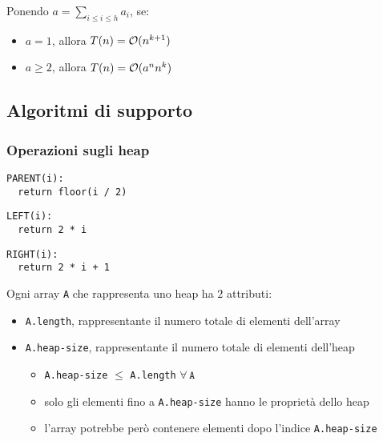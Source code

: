 \documentclass[italian, 10pt]{article}
\begin{document}
Ponendo \(a = \displaystyle \sum_{i \leq i \leq h} a_i\), se:

\begin{itemize}
  \item \(a = 1\), allora \(T(n) = \mathcal{O}(n^{k+1})\)
  \item \(a \geq 2\), allora \(T(n) = \mathcal{O}(a^n n^k)\)
\end{itemize}

\subsection{Algoritmi di supporto}

\subsubsection{Operazioni sugli heap}

\begin{center}
  \begin{minipage}{0.31\textwidth}
    \centering
    \begin{lstlisting}[style=pseudocode, numbers=none]
PARENT(i):
  return floor(i / 2)
\end{lstlisting}
  \end{minipage}
  \begin{minipage}{0.3\textwidth}
    \begin{lstlisting}[style=pseudocode, xleftmargin=20pt, xrightmargin=20pt, numbers=none]
LEFT(i):
  return 2 * i
\end{lstlisting}
  \end{minipage}
  \begin{minipage}{0.3\textwidth}
    \begin{lstlisting}[style=pseudocode, numbers=none]
RIGHT(i):
  return 2 * i + 1
\end{lstlisting}
  \end{minipage}
\end{center}

Ogni array \texttt{A} che rappresenta uno heap ha \(2\) attributi:

\begin{itemize}
  \item \texttt{A.length}, rappresentante il numero totale di elementi dell'array
  \item \texttt{A.heap-size}, rappresentante il numero totale di elementi dell'heap
        \begin{itemize}
          \item \texttt{A.heap-size} \(\leq\) \texttt{A.length} \(\forall \, \texttt{A}\)
          \item solo gli elementi fino a \texttt{A.heap-size} hanno le proprietà dello heap
          \item l'array potrebbe però contenere elementi dopo l'indice \texttt{A.heap-size}
        \end{itemize}
\end{itemize}
\end{document}
